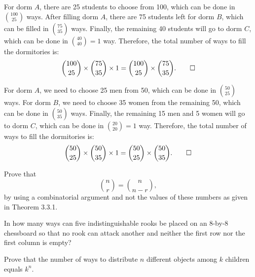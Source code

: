\begin{solution}[(i)]
  For dorm $A$, there are 25 students to choose from 100, which can be done in $\binom{100}{25}$ ways. After filling dorm $A$, there are 75 students left for dorm $B$, which can be filled in $\binom{75}{35}$ ways. Finally, the remaining 40 students will go to dorm $C$, which can be done in $\binom{40}{40} = 1$ way. Therefore, the total number of ways to fill the dormitories is:
  \[%
    \binom{100}{25} \times \binom{75}{35} \times 1 = \binom{100}{25} \times \binom{75}{35}
  .\qedhere\]%
\end{solution}

\begin{solution}[(ii)]
  For dorm $A$, we need to choose 25 men from 50, which can be done in $\binom{50}{25}$ ways. For dorm $B$, we need to choose 35 women from the remaining 50, which can be done in $\binom{50}{35}$ ways. Finally, the remaining 15 men and 5 women will go to dorm $C$, which can be done in $\binom{20}{20} = 1$ way. Therefore, the total number of ways to fill the dormitories is:
  \[%
    \binom{50}{25} \times \binom{50}{35} \times 1 = \binom{50}{25} \times \binom{50}{35}
  .\qedhere\]%
\end{solution}

\begin{problem}[16]
  Prove that
  \[%
    \binom{n}{r} = \binom{n}{n-r}
  ,\]%
  by using a combinatorial argument and not the values of these numbers as given in Theorem 3.3.1.
\end{problem}

\begin{solution}
\end{solution}

\begin{problem}[27]
  In how many ways can five indistinguishable rooks be placed on an 8-by-8 chessboard so that no rook can attack another and neither the first row nor the first column is empty?
\end{problem}

\begin{solution}
\end{solution}

\begin{problem}[44]
  Prove that the number of ways to distribute $n$ different objects among $k$ children equals $k^n$.
\end{problem}

\begin{solution}
\end{solution}

